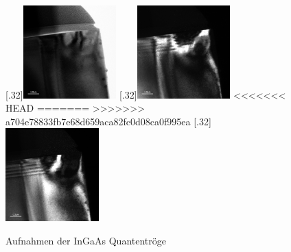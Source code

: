 \documentclass[a4paper,11pt,DIV=11]{scrartcl}
\begin{document}
\begin{figure}[htb]\centering
	[.32\linewidth]{\includegraphics[width=0.32\textwidth]{Versuchsdaten/10/hell.jpg}}
	[.32\linewidth]{\includegraphics[width=0.32\textwidth]{Versuchsdaten/10/004-dunkel.jpg}}
<<<<<<< HEAD
=======
>>>>>>> a704e78833fb7e68d659aca82fc0d08ca0f995ea
	[.32\linewidth]{\includegraphics[width=0.32\textwidth]{Versuchsdaten/10/022-dunkel.jpg}}
	\caption{Aufnahmen der InGaAs Quantentröge} \label{dunkelhell}
\end{figure}
\end{document}
